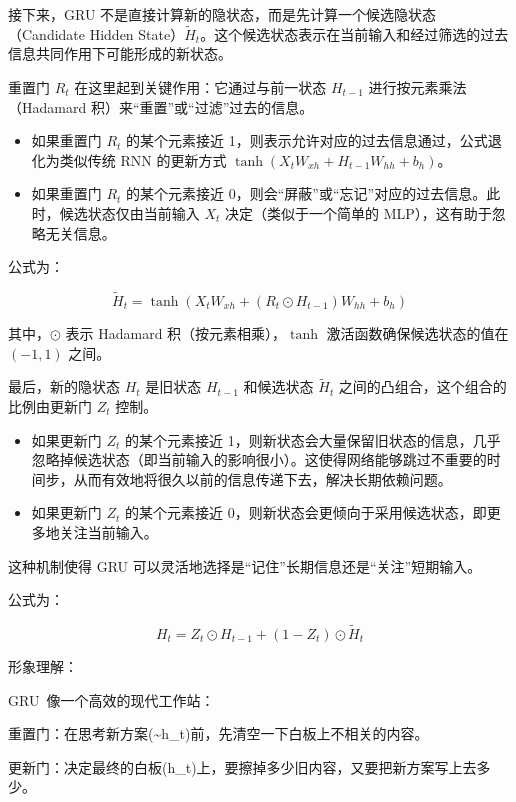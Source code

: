 接下来，GRU 不是直接计算新的隐状态，而是先计算一个候选隐状态（Candidate Hidden State）\(\tilde{H}_t\)。这个候选状态表示在当前输入和经过筛选的过去信息共同作用下可能形成的新状态。

重置门 \(R_t\) 在这里起到关键作用：它通过与前一状态 \(H_{t-1}\) 进行按元素乘法（Hadamard 积）来``重置''或``过滤''过去的信息。

\begin{itemize}
\tightlist
\item
  如果重置门 \(R_t\) 的某个元素接近 1，则表示允许对应的过去信息通过，公式退化为类似传统 RNN 的更新方式 \(\tanh(X_t W_{xh} + H_{t-1}W_{hh} + b_h)\)。
\item
  如果重置门 \(R_t\) 的某个元素接近 0，则会``屏蔽''或``忘记''对应的过去信息。此时，候选状态仅由当前输入 \(X_t\) 决定（类似于一个简单的 MLP），这有助于忽略无关信息。
\end{itemize}

公式为：

\[
\tilde{H}_t = \tanh(X_t W_{xh} + (R_t \odot H_{t-1})W_{hh} + b_h)
\]

其中，\(\odot\) 表示 Hadamard 积（按元素相乘），\(\tanh\) 激活函数确保候选状态的值在 \((-1, 1)\) 之间。

最后，新的隐状态 \(H_t\) 是旧状态 \(H_{t-1}\) 和候选状态 \(\tilde{H}_t\) 之间的凸组合，这个组合的比例由更新门 \(Z_t\) 控制。

\begin{itemize}
\tightlist
\item
  如果更新门 \(Z_t\) 的某个元素接近 1，则新状态会大量保留旧状态的信息，几乎忽略掉候选状态（即当前输入的影响很小）。这使得网络能够跳过不重要的时间步，从而有效地将很久以前的信息传递下去，解决长期依赖问题。
\item
  如果更新门 \(Z_t\) 的某个元素接近 0，则新状态会更倾向于采用候选状态，即更多地关注当前输入。
\end{itemize}

这种机制使得 GRU 可以灵活地选择是``记住''长期信息还是``关注''短期输入。

公式为：

\[
H_t = Z_t \odot H_{t-1} + (1 - Z_t) \odot \tilde{H}_t
\]

形象理解：

GRU~像一个高效的现代工作站：

重置门：在思考新方案(\textasciitilde h\_t)前，先清空一下白板上不相关的内容。

更新门：决定最终的白板(h\_t)上，要擦掉多少旧内容，又要把新方案写上去多少。

